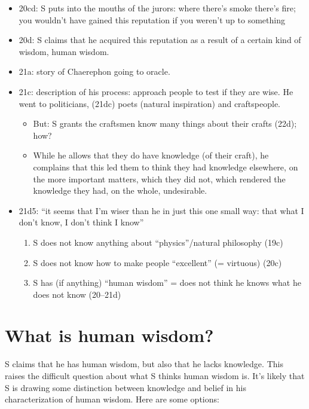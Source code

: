 \documentclass[oneside]{article}
\begin{document}
\begin{description}
\begin{itemize}
\item 20cd: S puts into the mouths of the jurors: where there's smoke there's fire; you wouldn't have gained this reputation if you weren't up to something
\item 20d: S claims that he acquired this reputation as a result of a certain kind of wisdom, human wisdom.
\item	21a: story of Chaerephon going to oracle.
\item	21c: description of his process: approach people to test if they are wise. He went to politicians, (21dc) poets (natural inspiration) and craftspeople.
\begin{itemize} \item  But: S grants the craftsmen know many things about their crafts (22d); how? 
\item While he allows that they do have knowledge (of their craft), he complains that this led them to think they had knowledge elsewhere, on the more important matters, which they did not, which rendered the knowledge they had, on the whole, undesirable.
\end{itemize}
\item  21d5: ``it seems that I'm wiser than he in just this one small way: that what I don't know, I don't think I know''
\begin{enumerate}
\item S does not know anything about ``physics''/natural philosophy (19c)
\item S does not know how to make people ``excellent'' (= virtuous) (20c)
\item S has (if anything) ``human wisdom'' = does not think he knows what he does not know (20--21d)
\end{enumerate}
\end{itemize}


\section*{What is human wisdom?}
S claims that he has human wisdom, but also that he lacks knowledge. This raises the difficult question about what S thinks human wisdom is. It's likely that S is drawing some distinction between knowledge and belief in his characterization of human wisdom. Here are some options:


\end{description}
\end{document}
